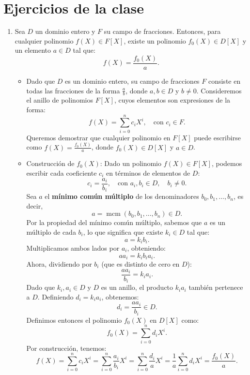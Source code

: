 \documentclass[12pt]{article}
\theoremstyle{definition}
\theoremstyle{remark}
\begin{document}
\section*{Ejercicios de la clase}
\begin{enumerate}
    \item Sea $D$ un dominio entero y $F$ su campo de fracciones. Entonces, para cualquier polinomio $f(X) \in F[X]$, existe un polinomio $f_0(X) \in D[X]$ y un elemento $a \in D$ tal que:
    \[
    f(X) = \frac{f_0(X)}{a}.
    \]
    \begin{itemize}

        \item Dado que $D$ es un dominio entero, su campo de fracciones $F$ consiste en todas las fracciones de la forma $\frac{a}{b}$, donde $a, b \in D$ y $b \neq 0$. Consideremos el anillo de polinomios $F[X]$, cuyos elementos son expresiones de la forma:
        \[
        f(X) = \sum_{i=0}^{n} c_i X^i, \quad \text{con } c_i \in F.
        \]
        Queremos demostrar que cualquier polinomio en $F[X]$ puede escribirse como $f(X) = \frac{f_0(X)}{a}$, donde $f_0(X) \in D[X]$ y $a \in D$.

        \item Construcción de $f_0(X)$: Dado un polinomio $f(X) \in F[X]$, podemos escribir cada coeficiente $c_i$ en términos de elementos de $D$:
        \[
        c_i = \frac{a_i}{b_i}, \quad \text{con } a_i, b_i \in D, \quad b_i \neq 0.
        \]
        Sea $a$ el \textbf{mínimo común múltiplo} de los denominadores $b_0, b_1, \dots, b_n$, es decir,
        \[
        a = \operatorname{mcm}(b_0, b_1, \dots, b_n) \in D.
        \]
        Por la propiedad del mínimo común múltiplo, sabemos que $a$ es un múltiplo de cada $b_i$, lo que significa que existe $k_i \in D$ tal que:
        \[
        a = k_i b_i.
        \]
        Multiplicamos ambos lados por $a_i$, obteniendo:
        \[
        a a_i = k_i b_i a_i.
        \]
        Ahora, dividiendo por $b_i$ (que es distinto de cero en $D$):
        \[
        \frac{a a_i}{b_i} = k_i a_i.
        \]
        Dado que $k_i, a_i \in D$ y $D$ es un anillo, el producto $k_i a_i$ también pertenece a $D$. Definiendo $d_i = k_i a_i$, obtenemos:
        \[
        d_i = \frac{a a_i}{b_i} \in D.
        \]
        Definimos entonces el polinomio $f_0(X)$ en $D[X]$ como:
        \[
        f_0(X) = \sum_{i=0}^{n} d_i X^i.
        \]
        Por construcción, tenemos:
        \[
        f(X) = \sum_{i=0}^{n} c_i X^i = \sum_{i=0}^{n} \frac{a_i}{b_i} X^i = \sum_{i=0}^{n} \frac{d_i}{a} X^i = \frac{1}{a} \sum_{i=0}^{n} d_i X^i = \frac{f_0(X)}{a}.
        \]


\end{itemize}
\end{enumerate}
\end{document}
